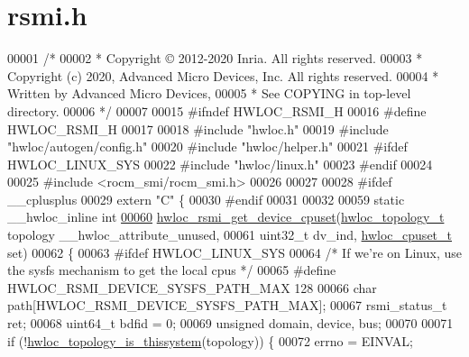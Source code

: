 \hypertarget{a00161_source}{}\section{rsmi.\+h}
\label{a00161_source}

\begin{DoxyCode}
00001 \textcolor{comment}{/*}
00002 \textcolor{comment}{ * Copyright © 2012-2020 Inria.  All rights reserved.}
00003 \textcolor{comment}{ * Copyright (c) 2020, Advanced Micro Devices, Inc. All rights reserved.}
00004 \textcolor{comment}{ * Written by Advanced Micro Devices,}
00005 \textcolor{comment}{ * See COPYING in top-level directory.}
00006 \textcolor{comment}{ */}
00007 
00015 \textcolor{preprocessor}{#ifndef HWLOC\_RSMI\_H}
00016 \textcolor{preprocessor}{#define HWLOC\_RSMI\_H}
00017 
00018 \textcolor{preprocessor}{#include "hwloc.h"}
00019 \textcolor{preprocessor}{#include "hwloc/autogen/config.h"}
00020 \textcolor{preprocessor}{#include "hwloc/helper.h"}
00021 \textcolor{preprocessor}{#ifdef HWLOC\_LINUX\_SYS}
00022 \textcolor{preprocessor}{#include "hwloc/linux.h"}
00023 \textcolor{preprocessor}{#endif}
00024 
00025 \textcolor{preprocessor}{#include <rocm\_smi/rocm\_smi.h>}
00026 
00027 
00028 \textcolor{preprocessor}{#ifdef \_\_cplusplus}
00029 \textcolor{keyword}{extern} \textcolor{stringliteral}{"C"} \{
00030 \textcolor{preprocessor}{#endif}
00031 
00032 
00059 \textcolor{keyword}{static} \_\_hwloc\_inline \textcolor{keywordtype}{int}
\hyperlink{a00222_gaf939e697e3769c3524255318262b9c29}{00060} \hyperlink{a00222_gaf939e697e3769c3524255318262b9c29}{hwloc\_rsmi\_get\_device\_cpuset}(\hyperlink{a00186_ga9d1e76ee15a7dee158b786c30b6a6e38}{hwloc\_topology\_t} topology 
      \_\_hwloc\_attribute\_unused,
00061                              uint32\_t dv\_ind, \hyperlink{a00183_ga4bbf39b68b6f568fb92739e7c0ea7801}{hwloc\_cpuset\_t} \textcolor{keyword}{set})
00062 \{
00063 \textcolor{preprocessor}{#ifdef HWLOC\_LINUX\_SYS}
00064   \textcolor{comment}{/* If we're on Linux, use the sysfs mechanism to get the local cpus */}
00065 \textcolor{preprocessor}{#define HWLOC\_RSMI\_DEVICE\_SYSFS\_PATH\_MAX 128}
00066   \textcolor{keywordtype}{char} path[HWLOC\_RSMI\_DEVICE\_SYSFS\_PATH\_MAX];
00067   rsmi\_status\_t ret;
00068   uint64\_t bdfid = 0;
00069   \textcolor{keywordtype}{unsigned} domain, device, bus;
00070 
00071   \textcolor{keywordflow}{if} (!\hyperlink{a00193_ga68ffdcfd9175cdf40709801092f18017}{hwloc\_topology\_is\_thissystem}(topology)) \{
00072     errno = EINVAL;

\end{DoxyCode}
